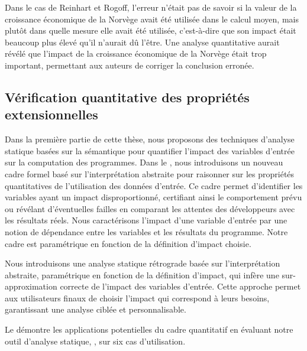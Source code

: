 {Dans le cas de Reinhart et Rogoff, l'erreur n'était pas de savoir si la valeur de la croissance économique de la Norvège avait été utilisée dans le calcul moyen, mais plutôt dans quelle mesure elle avait été utilisée, c'est-à-dire que son impact était beaucoup plus élevé qu'il n'aurait dû l'être. Une analyse quantitative aurait révélé que l'impact de la croissance économique de la Norvège était trop important, permettant aux auteurs de corriger la conclusion erronée.

\subsection*{Vérification quantitative des propriétés extensionnelles}


Dans la première partie de cette thèse, nous proposons des techniques d'analyse statique basées sur la sémantique pour quantifier l'impact des variables d'entrée sur la computation des programmes. Dans le , nous introduisons un nouveau cadre formel basé sur l'interprétation abstraite pour raisonner sur les propriétés quantitatives de l'utilisation des données d'entrée. Ce cadre permet d'identifier les variables ayant un impact disproportionné, certifiant ainsi le comportement prévu ou révélant d'éventuelles failles en comparant les attentes des développeurs avec les résultats réels. Nous caractérisons l'impact d'une variable d'entrée par une notion de dépendance entre les variables et les résultats du programme. Notre cadre est paramétrique en fonction de la définition d'impact choisie.

Nous introduisons une analyse statique rétrograde basée sur l'interprétation abstraite, paramétrique en fonction de la définition d'impact, qui infère une sur-approximation correcte de l'impact des variables d'entrée. Cette approche permet aux utilisateurs finaux de choisir l'impact qui correspond à leurs besoins, garantissant une analyse ciblée et personnalisable.

Le  démontre les applications potentielles du cadre quantitatif en évaluant notre outil d'analyse statique, \impatto\sidenote{\label{intro:impatto}\impattourl}, sur six cas d'utilisation.

}
